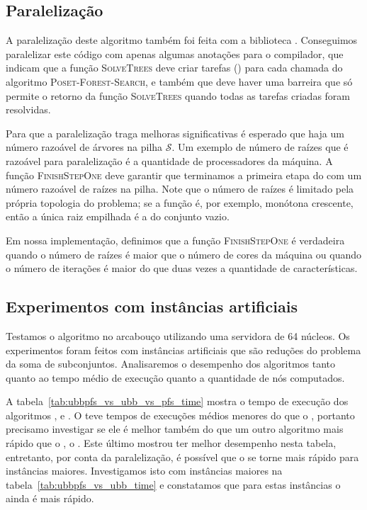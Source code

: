 \subsection{Paralelização}
A paralelização deste algoritmo também foi feita com a biblioteca 
. Conseguimos paralelizar este código com apenas 
algumas anotações para o compilador, que indicam que a função
\textsc{SolveTrees} deve criar tarefas () para cada 
chamada do algoritmo \textsc{Poset-Forest-Search}, e também que deve 
haver uma barreira que só permite o retorno da função 
\textsc{SolveTrees} quando todas as tarefas criadas foram resolvidas.

Para que a paralelização traga melhoras significativas é esperado que
haja um número razoável de árvores na pilha $\mathcal{S}$. Um exemplo de
número de raízes que é razoável para paralelização é a quantidade de
processadores da máquina. A função \textsc{FinishStepOne} deve garantir
que terminamos a primeira etapa do  com um número
razoável de raízes na pilha. Note que o número de raízes é limitado
pela própria topologia do problema; se a função é, por exemplo, monótona
crescente, então a única raiz empilhada é a do conjunto vazio.

Em nossa implementação, definimos que a função \textsc{FinishStepOne} é
verdadeira quando o número de raízes é maior que o número de cores da 
máquina ou quando o número de iterações é maior do que duas vezes a 
quantidade de características. 

\subsection{Experimentos com instâncias artificiais}
Testamos o algoritmo  no arcabouço 
utilizando uma servidora de 64 núcleos. Os experimentos foram feitos com 
instâncias artificiais que são reduções do problema da soma de
subconjuntos. Analisaremos o desempenho dos algoritmos tanto quanto ao 
tempo médio de execução quanto a quantidade de nós computados.

A tabela~\ref{tab:ubbpfs_vs_ubb_vs_pfs_time} mostra o tempo de execução
dos algoritmos ,  e . O 
 teve tempos de execuções médios menores do que o 
, portanto precisamo investigar se ele é melhor também do
que um outro algoritmo mais rápido que o , o .
Este último mostrou ter melhor desempenho nesta tabela, entretanto, 
por conta da paralelização, é possível que o  se torne 
mais rápido para instâncias maiores. Investigamos isto com instâncias
maiores na tabela~\ref{tab:ubbpfs_vs_ubb_time} e constatamos que 
para estas instâncias o  ainda é mais rápido.

